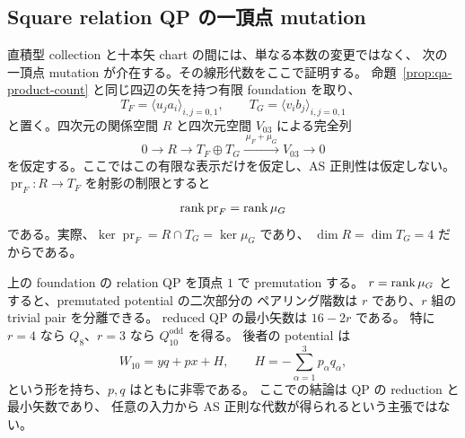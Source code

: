 \subsection{Square relation QP の一頂点 mutation}

直積型 collection と十本矢 chart の間には、単なる本数の変更ではなく、
次の一頂点 mutation が介在する。その線形代数をここで証明する。
命題~\ref{prop:qa-product-count} と同じ四辺の矢を持つ有限 foundation を取り、
\[
 T_F=\langle u_ja_i\rangle_{i,j=0,1},\qquad
 T_G=\langle v_ib_j\rangle_{i,j=0,1}
\]
と置く。四次元の関係空間 $R$ と四次元空間 $V_{03}$ による完全列
\begin{equation}
 0\longrightarrow R\longrightarrow T_F\oplus T_G
 \xrightarrow{\ \mu_F+\mu_G\ }V_{03}\longrightarrow0
 \label{eq:qa-square-composition-sequence}
\end{equation}
を仮定する。ここではこの有限な表示だけを仮定し、AS 正則性は仮定しない。
$\operatorname{pr}_F:R\to T_F$ を射影の制限とすると
\begin{equation}
 \operatorname{rank}\operatorname{pr}_F=\operatorname{rank}\mu_G
 \label{eq:qa-opposite-rank}
\end{equation}
である。実際、$\ker\operatorname{pr}_F=R\cap T_G=\ker\mu_G$ であり、
$\dim R=\dim T_G=4$ だからである。

\begin{proposition}
\label{prop:qa-square-mutation-count}
上の foundation の relation QP を頂点 $1$ で premutation する。
$r=\operatorname{rank}\mu_G$ とすると、premutated potential の二次部分の
ペアリング階数は $r$ であり、$r$ 組の trivial pair を分離できる。
reduced QP の最小矢数は $16-2r$ である。
特に $r=4$ なら $Q_8$、$r=3$ なら $Q_{10}^{\mathrm{odd}}$ を得る。
後者の potential は
\begin{equation}
 W_{10}=yq+px+H,\qquad H=-\sum_{\alpha=1}^3p_\alpha q_\alpha,
 \label{eq:qa-square-mutation-ten}
\end{equation}
という形を持ち、$p,q$ はともに非零である。
ここでの結論は QP の reduction と最小矢数であり、
任意の入力から AS 正則な代数が得られるという主張ではない。
\end{proposition}

